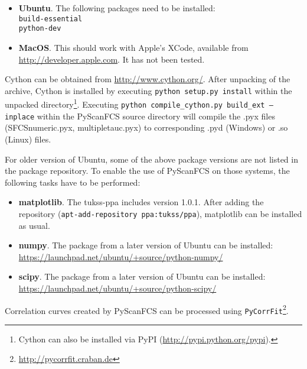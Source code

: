 \begin{itemize}
\begin{itemize}
\item[ ] \textbf{Ubuntu}. The following packages need to be installed:
\\
\texttt{build-essential\\
python-dev} 
\item[ ] \textbf{MacOS}. This should work with Apple's XCode, available from \url{http://developer.apple.com}. It has not been tested.
\end{itemize}
Cython can be obtained from \url{http://www.cython.org/}. After unpacking of the archive, Cython is installed by executing \texttt{python setup.py install} within the unpacked directory\footnote{Cython can also be installed via PyPI (\url{http://pypi.python.org/pypi}).}. Executing \texttt{python compile\_cython.py build{\_}ext --inplace} within the PyScanFCS source directory will compile the \mytilde .pyx files (SFCSnumeric.pyx, multipletauc.pyx) to corresponding \mytilde .pyd (Windows) or \mytilde .so (Linux) files.

For older version of Ubuntu, some of the above package versions are not listed in the package repository. To enable the use of PyScanFCS on those systems, the following tasks have to be performed:

\begin{itemize}
\item[ ] \textbf{matplotlib}. The tukss-ppa includes version 1.0.1. After adding the repository (\texttt{apt-add-repository ppa:tukss/ppa}), matplotlib can be installed as usual.
\item[ ] \textbf{numpy}. The package from a later version of Ubuntu can be installed: \url{https://launchpad.net/ubuntu/+source/python-numpy/}
\item[ ] \textbf{scipy}. The package from a later version of Ubuntu can be installed: \url{https://launchpad.net/ubuntu/+source/python-scipy/}
\end{itemize}

\end{itemize}

Correlation curves created by PyScanFCS can be processed using \texttt{PyCorrFit}\footnote{\url{http://pycorrfit.craban.de}}.

